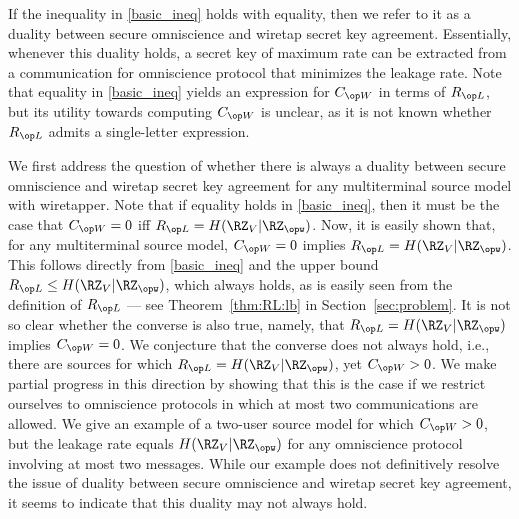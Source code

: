 If the inequality in \eqref{basic_ineq} holds with equality, then we refer to it as a duality between secure omniscience and wiretap secret key agreement.  Essentially, whenever this duality holds, a secret key of maximum rate can be extracted from a communication for omniscience protocol that minimizes the leakage rate. Note that equality in \eqref{basic_ineq} yields an expression for $\wskc$ in terms of $\rl$, but its utility towards computing $\wskc$ is unclear, as it is not known whether $\rl$ admits a single-letter expression.

We first address the question of whether there is always a duality between secure omniscience and wiretap secret key agreement for any multiterminal source model with wiretapper. Note that if equality holds in \eqref{basic_ineq}, then it must be the case that $\wskc = 0$ iff $\rl = H(\RZ_V | \RZ_{\opw})$. Now, it is easily shown that, for any multiterminal source model, $\wskc = 0$ implies $\rl = H(\RZ_V | \RZ_{\opw})$. This follows directly from \eqref{basic_ineq} and the upper bound $\rl \le H(\RZ_V | \RZ_{\opw})$, which always holds, as is easily seen from the definition of $\rl$ --- see Theorem~\ref{thm:RL:lb} in Section~\ref{sec:problem}. It is not so clear whether the converse is also true, namely, that $\rl = H(\RZ_V | \RZ_{\opw})$ implies $\wskc = 0$. We conjecture that  the converse does not always hold, i.e., there are sources for which $\rl = H(\RZ_V | \RZ_{\opw})$, yet $\wskc > 0$. We make partial progress in this direction by showing that this is the case if we restrict ourselves to omniscience protocols in which at most two communications are allowed. We give an example of a two-user source model for which $\wskc > 0$, but the leakage rate equals $H(\RZ_V | \RZ_{\opw})$ for any omniscience protocol involving at most two messages. While our example does not definitively resolve the issue of duality between secure omniscience and wiretap secret key agreement, it seems to indicate that this duality may not always hold.

